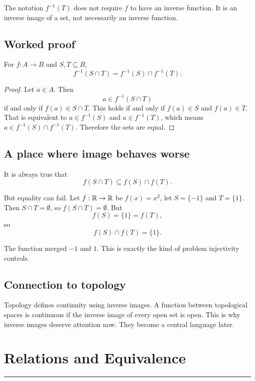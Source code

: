\documentclass[12pt]{article}
\newcommand{\chapterline}{\vspace{0.4em}\hrule\vspace{0.8em}}
\begin{document}
\begin{trapbox}
The notation $f^{-1}(T)$ does not require $f$ to have an inverse function. It is an inverse image of a set, not necessarily an inverse function.
\end{trapbox}

\subsection{Worked proof}

\begin{theorem}
For $f:A\to B$ and $S,T\subseteq B$,
\[
f^{-1}(S\cap T)=f^{-1}(S)\cap f^{-1}(T).
\]
\end{theorem}

\begin{proof}
Let $a\in A$. Then
\[
a\in f^{-1}(S\cap T)
\]
if and only if $f(a)\in S\cap T$. This holds if and only if $f(a)\in S$ and $f(a)\in T$. That is equivalent to $a\in f^{-1}(S)$ and $a\in f^{-1}(T)$, which means $a\in f^{-1}(S)\cap f^{-1}(T)$. Therefore the sets are equal.
\end{proof}

\subsection{A place where image behaves worse}

It is always true that
\[
f(S\cap T)\subseteq f(S)\cap f(T).
\]

But equality can fail. Let $f:\mathbb{R}\to\mathbb{R}$ be $f(x)=x^2$, let $S=\{-1\}$ and $T=\{1\}$. Then $S\cap T=\emptyset$, so $f(S\cap T)=\emptyset$. But
\[
f(S)=\{1\}=f(T),
\]
so
\[
f(S)\cap f(T)=\{1\}.
\]

The function merged $-1$ and $1$. This is exactly the kind of problem injectivity controls.

\subsection{Connection to topology}

Topology defines continuity using inverse images. A function between topological spaces is continuous if the inverse image of every open set is open. This is why inverse images deserve attention now. They become a central language later.

\newpage
\section{Relations and Equivalence}
\chapterline
\end{document}
